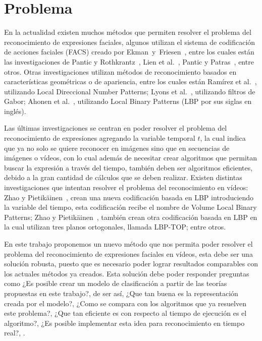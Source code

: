 \section{Problema}
\label{sec:problema}

En la actualidad existen muchos métodos que permiten resolver el problema del reconocimiento de expresiones faciales, algunos utilizan el sistema de codificación de acciones faciales (FACS) creado por Ekman~y~Friesen~\cite{Ekman1978}, entre los cuales están las investigaciones de Pantic y Rothkrantz~\cite{Pantic2004}, Lien et al.~\cite{Lien1998}, Pantic y Patras~\cite{Pantic2006}, entre otros. Otras investigaciones utilizan métodos de reconocimiento basados en características geométricas o de apariencia, entre los cuales están Ramírez et al.~\cite{RamirezRivera2013}, utilizando Local Direccional Number Patterns; Lyons et al.~\cite{Lyons1998}, utilizando filtros de Gabor; Ahonen et al.~\cite{Ahonen2006}, utilizando Local Binary Patterns (LBP por sus siglas en inglés).

Las últimas investigaciones se centran en poder resolver el problema del reconocimiento de expresiones agregando la variable temporal $t$, la cual indica que ya no solo se quiere reconocer en imágenes sino que en secuencias de imágenes o vídeos, con lo cual además de necesitar crear algoritmos que permitan buscar la expresión a través del tiempo, también deben ser algoritmos eficientes, debido a la gran cantidad de cálculos que se deben realizar. Existen distintas investigaciones que intentan resolver el problema del reconocimiento en vídeos: Zhao y Pietikäinen~\cite{Zhao2006}, crean una nueva codificación basada en LBP introduciendo la variable del tiempo, esta codificación recibe el nombre de Volume Local Binary Patterns; Zhao y Pietikäinen~\cite{Zhao2006}, también crean otra codificación basada en LBP en la cual utilizan tres planos ortogonales, llamada LBP-TOP; entre otros.

En este trabajo proponemos un nuevo método que nos permita poder resolver el problema del reconocimiento de expresiones faciales en vídeos, esta debe ser una solución robusta, puesto que es necesario poder lograr resultados comparables con los actuales métodos ya creados. Esta solución debe poder responder preguntas como ¿Es posible crear un modelo de clasificación a partir de las teorías propuestas en este trabajo?, de ser así, ¿Que tan buena es la representación creada por el modelo?, ¿Como se compara con los algoritmos que ya resuelven este problema?, ¿Que tan eficiente es con respecto al tiempo de ejecución es el algoritmo?, ¿Es posible implementar esta idea para reconocimiento en tiempo real?, \etc.




